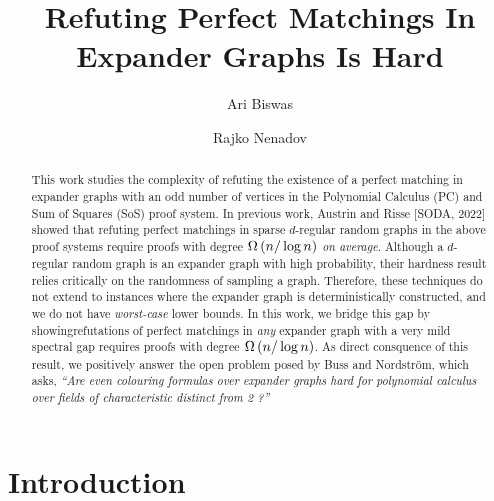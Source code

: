 \documentclass[11pt]{article}
\title{Refuting Perfect Matchings In Expander Graphs Is Hard}
\author[1]{Ari Biswas}
\author[2]{Rajko Nenadov}
\affil[1]{\small University Of Warwick, United Kingdom}
\affil[2]{\small University Of Auckland, New Zealand}
\date{}
\begin{document}
\maketitle
\begin{abstract}
This work studies the complexity of refuting the existence of a perfect matching in expander graphs with an odd number of vertices in the Polynomial Calculus (PC) and Sum of Squares (SoS) proof system.
In previous work, Austrin and Risse [SODA, 2022] showed that refuting perfect matchings in sparse $d$-regular random graphs in the above proof systems require proofs with degree $\Omega\left(n/\log n\right)$ \emph{on average}. 
Although a $d$-regular random graph is an expander graph with high probability, their hardness result relies critically on the randomness of sampling a graph.
Therefore, these techniques do not extend to instances where the expander graph is deterministically constructed, and we do not have  \emph{worst-case} lower bounds.
In this work, we bridge this gap by showingrefutations of perfect matchings in \emph{any} expander graph with a very mild spectral gap requires proofs with degree $\Omega\left(n/\log n\right)$.
As direct consquence of this result, we positively answer the open problem posed by Buss and  Nordstr{\"o}m, which asks, \textit{``Are even colouring formulas over expander graphs hard for polynomial calculus over fields of characteristic distinct from 2 ?''}
\end{abstract}

\section{Introduction}
\end{document}
